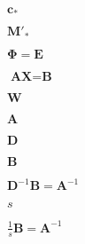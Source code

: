 \documentclass{article}
\begin{document}
$\textbf{c}_*$
\pagebreak

$\textbf{M}'_*$
\pagebreak

$\boldsymbol{\Phi} = \textbf{E}$
\pagebreak

$\textbf{AX} = \textbf{B}$
\pagebreak

$\textbf{W}$
\pagebreak

$\textbf{A}$
\pagebreak

$\textbf{D}$
\pagebreak

$\textbf{B}$
\pagebreak

$\textbf{D}^{-1}\textbf{B} = \textbf{A}^{-1}$
\pagebreak

$s$
\pagebreak

$\frac{1}{s}\textbf{B} = \textbf{A}^{-1}$
\pagebreak
\end{document}

